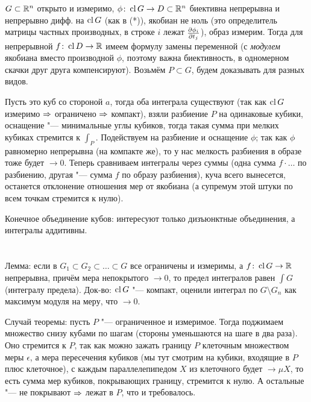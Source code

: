 \section{} %
$G \subset \mathbb{R}^n$ открыто и измеримо, $\phi \colon \operatorname{cl} G \to D \subset \mathbb{R}^n$ биективна непрерывна и непрерывно дифф. на $\operatorname{cl} G$ (как в (*)), якобиан не ноль
(это определитель матрицы частных производных, в строке $i$ лежат $\frac{\partial \phi_i}{\partial t_j}$), образ измерим.
Тогда для непрерывной $f \colon \operatorname{cl} D \to \mathbb{R}$ имеем формулу замены переменной (с \textit{модулем} якобиана вместо производной $\phi$, поэтому важна биективность, в одномерном скачки друг друга компенсируют).
Возьмём $P \subset G$, будем доказывать для разных видов.

Пусть это куб со стороной $a$, тогда оба интеграла существуют (так как $\operatorname{cl} G$ измеримо $\Rightarrow$ ограничено $\Rightarrow$ компакт), взяли разбиение $P$ на одинаковые кубики, оснащение "--- минимальные углы кубиков,
тогда такая сумма при мелких кубиках стремится к $\int_P$.
Подействуем на разбиение и оснащение $\phi$; так как $\phi$ равномерно непрерывна (на компакте же), то у нас мелкость разбиения в образе тоже будет $\to 0$.
Теперь сравниваем интегралы через суммы (одна сумма $f\cdot \dots$ по разбиению, другая "--- сумма $f$ по образу разбиения), куча всего вынесется,
останется отклонение отношения мер от якобиана (а супремум этой штуки по всем точкам стремится к нулю).

Конечное объединение кубов: интересуют только дизъюнктные объединения, а интегралы аддитивны.

\pagebreak
\section{} %
Лемма: если в $G_1\subset G_2 \subset \dots \subset G$ все ограничены и измеримы, а $f \colon \operatorname{cl} G \to \mathbb{R}$ непрерывна, причём мера непокрытого $\to 0$, то предел интегралов равен $\int G$ (интегралу предела).
Док-во: $\operatorname{cl} G$ "--- компакт, оценили интеграл по $G \setminus G_n$ как максимум модуля на меру, что $\to 0$.

Случай теоремы: пусть $P$ "--- ограниченное и измеримое.
Тогда поджимаем множество снизу кубами по шагам (стороны уменьшаются на шаге в два раза).
Оно стремится к $P$, так как можно зажать границу $P$ клеточным множеством меры $\epsilon$, а мера пересечения кубиков (мы тут смотрим на кубики, входящие в $P$ плюс клеточное),
с каждым параллелепипедом $X$ из клеточного будет $\to \mu X$, то есть сумма мер кубиков, покрывающих границу, стремится к нулю.
А остальные "--- не покрывают $\Rightarrow$ лежат в $P$, что и требовалось.


